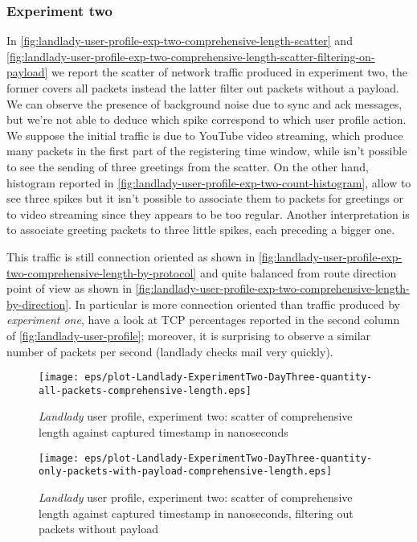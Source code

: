 \documentclass[10pt,a4paper]{article}
\begin{document}
    \subsubsection*{Experiment two}
    In
    \autoref{fig:landlady-user-profile-exp-two-comprehensive-length-scatter}
    and
    \autoref{fig:landlady-user-profile-exp-two-comprehensive-length-scatter-filtering-on-payload}
    we report the scatter of network traffic produced in experiment
    two, the former covers all packets instead the latter filter out
    packets without a payload. We can observe the presence of
    background noise due to sync and ack messages, but we're not able
    to deduce which spike correspond to which user profile action.  We
    suppose the initial traffic is due to YouTube video streaming,
    which produce many packets in the first part of the registering
    time window, while isn't possible to see the sending of three
    greetings from the scatter. On the other hand, histogram reported
    in \autoref{fig:landlady-user-profile-exp-two-count-histogram},
    allow to see three spikes but it isn't possible to associate them
    to packets for greetings or to video streaming since they appears
    to be too regular. Another interpretation is to associate greeting
    packets to three little spikes, each preceding a bigger one.

    This traffic is still connection oriented as shown in
    \autoref{fig:landlady-user-profile-exp-two-comprehensive-length-by-protocol}
    and quite balanced from route direction point of view as shown in
    \autoref{fig:landlady-user-profile-exp-two-comprehensive-length-by-direction}. In
    particular is more connection oriented than traffic produced by
    \emph{experiment one}, have a look at TCP percentages reported in
    the second column of \autoref{fig:landlady-user-profile};
    moreover, it is surprising to observe a similar number of packets
    per second (landlady checks mail very quickly).

    \begin{figure}
      \centering
      \texttt{[image: eps/plot-Landlady-ExperimentTwo-DayThree-quantity-all-packets-comprehensive-length.eps]}
      \caption{\emph{Landlady} user profile, experiment two: scatter
        of comprehensive length against captured timestamp in
        nanoseconds}
      \label{fig:landlady-user-profile-exp-two-comprehensive-length-scatter}
    \end{figure}

    \begin{figure}
      \centering
      \texttt{[image: eps/plot-Landlady-ExperimentTwo-DayThree-quantity-only-packets-with-payload-comprehensive-length.eps]}
      \caption{\emph{Landlady} user profile, experiment two: scatter
        of comprehensive length against captured timestamp in
        nanoseconds, filtering out packets without payload}
      \label{fig:landlady-user-profile-exp-two-comprehensive-length-scatter-filtering-on-payload}
    \end{figure}
    
\end{document}
